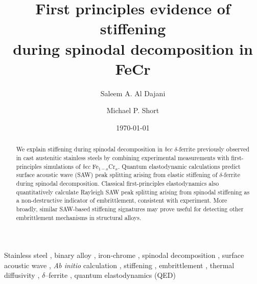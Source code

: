 \documentclass[final,3p,times]{elsarticle}
\begin{document}
\begin{frontmatter}

\title
{
\textbf
{
First principles evidence of stiffening \\ during spinodal decomposition in FeCr
}
}

\date
{\today}
\rhead{\today}

\author[1]{Saleem A. Al Dajani}
\author[1]{Michael P. Short}

\address{
Department of Nuclear Science and Engineering \\
Massachusetts Institute of Technology\\
77 Massachusetts Avenue \\
Cambridge, MA 02139}

\address[1]
{
Corresponding Author: \href{mailto:sdajani@mit.edu}{\texttt{sdajani@mit.edu}}
}

\begin{abstract}

We explain stiffening during spinodal decomposition in \emph{bcc} $\delta$-ferrite previously observed in cast austenitic stainless steels by combining experimental measurements with first-principles simulations of \emph{bcc} Fe$_{1-x}$Cr$_x$. Quantum elastodynamic calculations predict surface acoustic wave (SAW) peak splitting arising from elastic stiffening of $\delta$-ferrite during spinodal decomposition. Classical first-principles elastodynamics also quantitatively calculate Rayleigh SAW peak splitting arising from spinodal stiffening as a non-destructive indicator of embrittlement, consistent with experiment. More broadly, similar SAW-based stiffening signatures may prove useful for detecting other embrittlement mechanisms in structural alloys.

\end{abstract}

\begin{keyword}
Stainless steel \sep 
binary alloy \sep
iron-chrome \sep
spinodal decomposition
\sep
surface acoustic wave \sep 
\emph{Ab initio} calculation
\sep
stiffening
\sep
embrittlement
\sep
thermal diffusivity
\sep
$\delta$--ferrite
\sep
quantum elastodynamics (QED)


\end{keyword}

\end{frontmatter}
\end{document}
